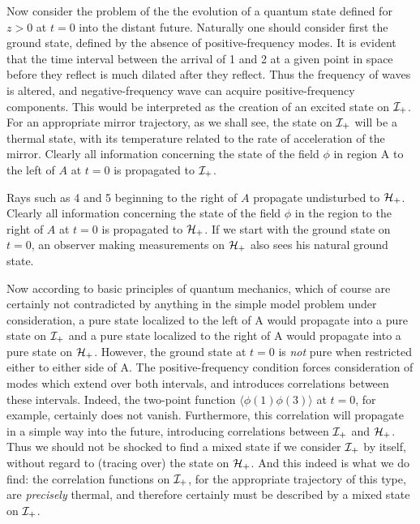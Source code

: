 Now consider the problem of the the evolution of a quantum state
defined for $z>0$ at $t=0$ into the distant future.  Naturally one should
consider first the ground state, defined by the absence of
positive-frequency modes.
It is evident that the time interval between
the arrival of 1 and 2 at a given point in space before they
reflect is much dilated after they reflect.  Thus the frequency of
waves is altered, and negative-frequency wave can acquire positive-frequency
components.  This would be interpreted as the creation of an excited
state on ${\cal I}_+$.  For an appropriate mirror trajectory, as
we shall see,
the state on ${\cal I}_+$ will be a thermal state, with its temperature
related to the rate of acceleration of the mirror.
Clearly all information concerning the state of the field
$\phi$ in region A to the left of $A$ at $t=0$ is propagated to
${\cal I}_+$.

Rays such as 4 and 5 beginning to
the right of $A$ propagate undisturbed to
${\cal H}_+$.
Clearly all information concerning the state of the field
$\phi$ in the region to the right of $A$ at $t=0$ is propagated to
${\cal H}_+$.
If we start with the ground state
on $t=0$, an
observer making measurements on ${\cal H}_+$
also sees his natural
ground state.

Now according to basic principles of quantum mechanics, which of course
are certainly
not contradicted by anything in the simple
model problem under consideration,
a pure state localized to the left of A would propagate into a pure state on
${\cal I}_+$ and a pure state localized to the right of A
would propagate into a pure
state on ${\cal H}_+$.  However, the ground state at $t=0$ is
{\it not\/} pure when restricted either to either side of A.
The positive-frequency
condition forces consideration of modes which
extend over both intervals, and introduces
correlations between these intervals.   Indeed, the two-point function
$\langle \phi (1) \phi (3) \rangle $ at $t=0$, for example,
certainly does not vanish.  Furthermore, this correlation will
propagate in a simple way into the future, introducing correlations
between ${\cal I}_+$ and ${\cal H}_+$.
Thus we should not be shocked to find
a mixed state if we consider ${\cal I}_+$ by itself, without
regard to (tracing over) the state on ${\cal H}_+$.   And this indeed is
what we do find: the correlation functions on ${\cal I}_+$, for the
appropriate trajectory of this type, are {\it precisely\/} thermal,
and therefore
certainly must be described by a mixed state on ${\cal I}_+$.

